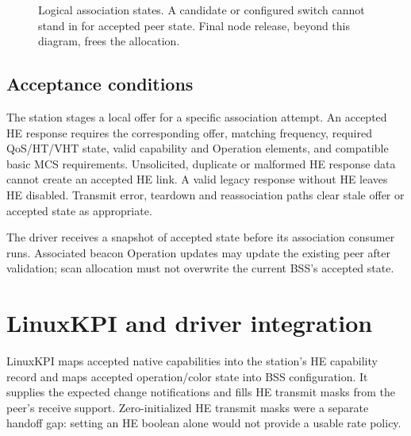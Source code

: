 \documentclass[11pt,letterpaper,oneside]{article}
\begin{document}
\begin{figure}[H]\centering
{}\caption{Logical association states. A candidate or configured switch cannot stand in for accepted peer state. Final node release, beyond this diagram, frees the allocation.}\end{figure}

\subsection{Acceptance conditions}
The station stages a local offer for a specific association attempt. An accepted HE response requires the corresponding offer, matching frequency, required QoS/HT/VHT state, valid capability and Operation elements, and compatible basic MCS requirements. Unsolicited, duplicate or malformed HE response data cannot create an accepted HE link. A valid legacy response without HE leaves HE disabled. Transmit error, teardown and reassociation paths clear stale offer or accepted state as appropriate.

The driver receives a snapshot of accepted state before its association consumer runs. Associated beacon Operation updates may update the existing peer after validation; scan allocation must not overwrite the current BSS's accepted state.

\section{LinuxKPI and driver integration}
LinuxKPI maps accepted native capabilities into the station's HE capability record and maps accepted operation/color state into BSS configuration. It supplies the expected change notifications and fills HE transmit masks from the peer's receive support. Zero-initialized HE transmit masks were a separate handoff gap: setting an HE boolean alone would not provide a usable rate policy.
\end{document}
